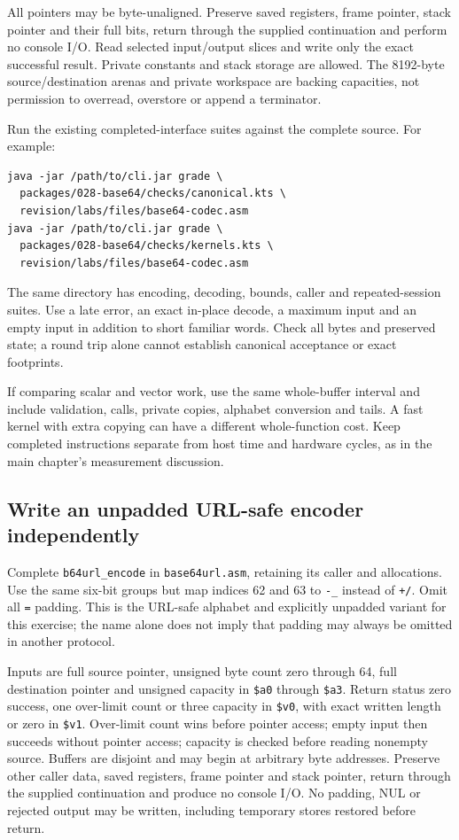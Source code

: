 All pointers may be byte-unaligned. Preserve saved registers, frame pointer,
stack pointer and their full bits, return through the supplied continuation and
perform no console I/O. Read selected input/output slices and write only the
exact successful result. Private constants and stack storage are allowed. The
8192-byte source/destination arenas and private workspace are backing capacities,
not permission to overread, overstore or append a terminator.

Run the existing completed-interface suites against the complete source. For
example:
\begin{verbatim}
java -jar /path/to/cli.jar grade \
  packages/028-base64/checks/canonical.kts \
  revision/labs/files/base64-codec.asm
java -jar /path/to/cli.jar grade \
  packages/028-base64/checks/kernels.kts \
  revision/labs/files/base64-codec.asm
\end{verbatim}
The same directory has encoding, decoding, bounds, caller and repeated-session
suites. Use a late error, an exact in-place decode, a maximum input and an empty
input in addition to short familiar words. Check all bytes and preserved state;
a round trip alone cannot establish canonical acceptance or exact footprints.

If comparing scalar and vector work, use the same whole-buffer interval and
include validation, calls, private copies, alphabet conversion and tails. A fast
kernel with extra copying can have a different whole-function cost. Keep
completed instructions separate from host time and hardware cycles, as in the
main chapter's measurement discussion.

\subsection*{Write an unpadded URL-safe encoder independently}

Complete \texttt{b64url\_encode} in \texttt{base64url.asm}, retaining its caller
and allocations. Use the same six-bit groups but map indices 62 and 63 to
\texttt{-\_} instead of \texttt{+/}. Omit all \texttt{=} padding. This is the
URL-safe alphabet and explicitly unpadded variant for this exercise; the name
alone does not imply that padding may always be omitted in another protocol.

Inputs are full source pointer, unsigned byte count zero through 64, full
destination pointer and unsigned capacity in \texttt{\$a0} through
\texttt{\$a3}. Return status zero success, one over-limit count or three capacity
in \texttt{\$v0}, with exact written length or zero in \texttt{\$v1}.
Over-limit count wins before pointer access; empty input then succeeds without
pointer access; capacity is checked before reading nonempty source. Buffers are
disjoint and may begin at arbitrary byte addresses. Preserve other caller data,
saved registers, frame pointer and stack pointer, return through the supplied
continuation and produce no console I/O. No padding, NUL or rejected output may
be written, including temporary stores restored before return.

